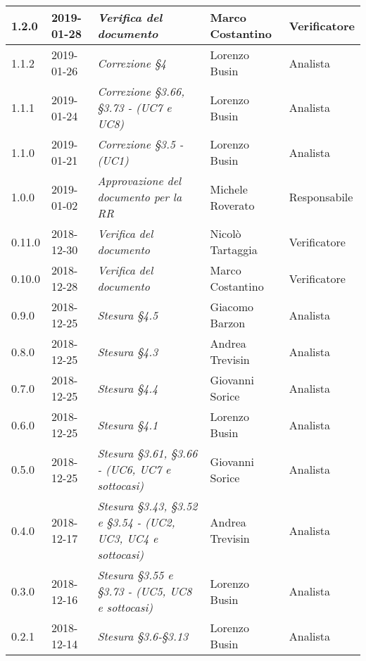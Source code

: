 \begin{longtable}{C{2cm}|C{2.5cm}|C{4.5cm}|C{2.5cm}|C{3cm}}
		1.2.0 & 2019-01-28 & \emph{Verifica del documento} & Marco Costantino & Verificatore \\
		\hline
	
		1.1.2 & 2019-01-26 & \emph{Correzione §4} & Lorenzo Busin & Analista \\
		\hline
	
		1.1.1 & 2019-01-24 & \emph{Correzione §3.66, §3.73 - (UC7 e UC8)} & Lorenzo Busin & Analista \\
		\hline	
	
		1.1.0 & 2019-01-21 & \emph{Correzione §3.5 - (UC1)} & Lorenzo Busin & Analista \\
		\hline
		
		1.0.0 & 2019-01-02 & \emph{Approvazione del documento per la RR} & Michele Roverato & Responsabile \\
		\hline
		
		0.11.0 & 2018-12-30 & \emph{Verifica del documento} & Nicolò Tartaggia & Verificatore \\
		\hline
		
		0.10.0 & 2018-12-28 & \emph{Verifica del documento} & Marco Costantino & Verificatore \\
		\hline
		
		0.9.0 & 2018-12-25 & \emph{Stesura §4.5} & Giacomo Barzon & Analista \\
		\hline
		
		0.8.0 & 2018-12-25 & \emph{Stesura §4.3} & Andrea Trevisin & Analista \\
		\hline
		
		0.7.0 & 2018-12-25 & \emph{Stesura §4.4} & Giovanni Sorice & Analista \\
		\hline
		
		0.6.0 & 2018-12-25 & \emph{Stesura §4.1} & Lorenzo Busin & Analista \\
		\hline
		
		0.5.0 & 2018-12-25 & \emph{Stesura §3.61, §3.66 - (UC6, UC7 e sottocasi)} & Giovanni Sorice & Analista \\
		\hline
		
		0.4.0 & 2018-12-17 & \emph{Stesura §3.43, §3.52 e §3.54 - (UC2, UC3, UC4 e sottocasi)} & Andrea Trevisin & Analista \\
		\hline
		
		0.3.0 & 2018-12-16 & \emph{Stesura §3.55 e §3.73 - (UC5, UC8 e sottocasi)} & Lorenzo Busin & Analista \\
		\hline
		
		0.2.1 & 2018-12-14 & \emph{Stesura §3.6-§3.13} & Lorenzo Busin & Analista \\
		\hline
		

\end{longtable}
